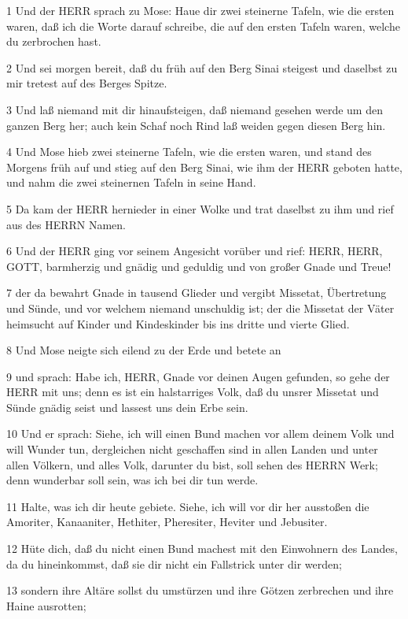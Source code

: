 \par 1 Und der HERR sprach zu Mose: Haue dir zwei steinerne Tafeln, wie die ersten waren, daß ich die Worte darauf schreibe, die auf den ersten Tafeln waren, welche du zerbrochen hast.
\par 2 Und sei morgen bereit, daß du früh auf den Berg Sinai steigest und daselbst zu mir tretest auf des Berges Spitze.
\par 3 Und laß niemand mit dir hinaufsteigen, daß niemand gesehen werde um den ganzen Berg her; auch kein Schaf noch Rind laß weiden gegen diesen Berg hin.
\par 4 Und Mose hieb zwei steinerne Tafeln, wie die ersten waren, und stand des Morgens früh auf und stieg auf den Berg Sinai, wie ihm der HERR geboten hatte, und nahm die zwei steinernen Tafeln in seine Hand.
\par 5 Da kam der HERR hernieder in einer Wolke und trat daselbst zu ihm und rief aus des HERRN Namen.
\par 6 Und der HERR ging vor seinem Angesicht vorüber und rief: HERR, HERR, GOTT, barmherzig und gnädig und geduldig und von großer Gnade und Treue!
\par 7 der da bewahrt Gnade in tausend Glieder und vergibt Missetat, Übertretung und Sünde, und vor welchem niemand unschuldig ist; der die Missetat der Väter heimsucht auf Kinder und Kindeskinder bis ins dritte und vierte Glied.
\par 8 Und Mose neigte sich eilend zu der Erde und betete an
\par 9 und sprach: Habe ich, HERR, Gnade vor deinen Augen gefunden, so gehe der HERR mit uns; denn es ist ein halstarriges Volk, daß du unsrer Missetat und Sünde gnädig seist und lassest uns dein Erbe sein.
\par 10 Und er sprach: Siehe, ich will einen Bund machen vor allem deinem Volk und will Wunder tun, dergleichen nicht geschaffen sind in allen Landen und unter allen Völkern, und alles Volk, darunter du bist, soll sehen des HERRN Werk; denn wunderbar soll sein, was ich bei dir tun werde.
\par 11 Halte, was ich dir heute gebiete. Siehe, ich will vor dir her ausstoßen die Amoriter, Kanaaniter, Hethiter, Pheresiter, Heviter und Jebusiter.
\par 12 Hüte dich, daß du nicht einen Bund machest mit den Einwohnern des Landes, da du hineinkommst, daß sie dir nicht ein Fallstrick unter dir werden;
\par 13 sondern ihre Altäre sollst du umstürzen und ihre Götzen zerbrechen und ihre Haine ausrotten;
